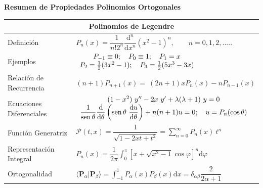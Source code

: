 \documentclass[spanish,notitlepage,letterpaper,12pt]{article}
\begin{document}
\begin{center}
\textbf{Resumen de Propiedades Polinomios Ortogonales}%

\begin{tabular}
[c]{|l|l|}\hline
\multicolumn{2}{|c|}{\textbf{Polinomios de Legendre}}\\\hline
Definici\'{o}n & $P_{n}(x)=\dfrac1{n!2^{n}}\dfrac{\mathrm{d}^{n}}%
{\mathrm{d}x^{n}}(x^{2}-1)^{n},\qquad n=0,1,2,.....$\\\hline
Ejemplos & $%
\begin{array}
[c]{c}%
P_{-1}\equiv0;\quad P_{0}\equiv1;\quad P_{1}=x\\
P_{2}=\frac12(3x^{2}-1);\quad P_{3}=\frac12(5x^{3}-3x)
\end{array}
$\\\hline
Relaci\'{o}n de Recurrencia & $\left(  n+1\right)  P_{n+1}(x)=\ \left(
2n+1\right)  xP_{n}(x)-nP_{n-1}(x)$\\\hline
Ecuaciones Diferenciales & $%
\begin{array}
[c]{c}%
(1-x^{2})\ y^{\prime\prime}-2x\ y^{\prime}+\lambda(\lambda+1)\ y=0\\
\dfrac1{\operatorname*{sen}\theta}\dfrac{\mathrm{d}}{\mathrm{d}\theta}\left(
\operatorname*{sen}\theta\ \dfrac{\mathrm{d}u}{\mathrm{d}\theta}\right)
+n(n+1)u=0;\quad u=P_{n}(\cos\theta)
\end{array}
$\\\hline
Funci\'{o}n Generatriz & $\mathcal{P}(t,x)=\dfrac1{\sqrt{1-2xt+t^{2}}}=%
{\displaystyle\sum_{n=0}^{\infty}}
P_{n}(x)\ t^{n}$\\\hline
Representaci\'{o}n Integral & $P_{n}(x)=\dfrac1{2\pi}%
{\displaystyle\int_{0}^{\pi}}
\left[  x+\sqrt{x^{2}-1}\cos\varphi\right]  ^{n}\mathrm{d}\varphi$\\\hline
Ortogonalidad & $\langle\mathbf{P}_{\alpha}|\mathbf{P}_{\beta}\rangle=%
{\displaystyle\int_{-1}^{1}}
P_{\alpha}(x)P_{\beta}(x)\mathrm{d}x=\delta_{\alpha\beta}\dfrac2{2\alpha+1}%
$\\\hline
\end{tabular}%


\end{center}
\end{document}
